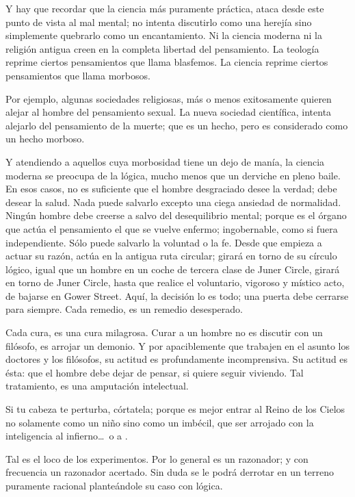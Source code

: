 Y hay que recordar que la ciencia más puramente práctica, ataca desde este punto de vista al mal
mental; no intenta discutirlo como una herejía sino simplemente quebrarlo como un encantamiento. Ni la
ciencia moderna ni la religión antigua creen en la completa libertad del pensamiento. La teología reprime
ciertos pensamientos que llama blasfemos. La ciencia reprime ciertos pensamientos que llama morbosos.

Por ejemplo, algunas sociedades religiosas, más o menos exitosamente quieren alejar al hombre del
pensamiento sexual. La nueva sociedad científica, intenta alejarlo del pensamiento de la muerte; que es un
hecho, pero es considerado como un hecho morboso.

Y atendiendo a aquellos cuya morbosidad tiene un dejo de manía, la ciencia moderna se preocupa
de la lógica, mucho menos que un derviche en pleno baile. En esos casos, no es suficiente que el hombre
desgraciado desee la verdad; debe desear la salud. Nada puede salvarlo excepto una ciega ansiedad de
normalidad. Ningún hombre debe creerse a salvo del desequilibrio mental; porque es el órgano que actúa
el pensamiento el que se vuelve enfermo; ingobernable, como si fuera independiente. Sólo puede salvarlo
la voluntad o la fe. Desde que empieza a actuar su razón, actúa en la antigua ruta circular; girará en torno
de su círculo lógico, igual que un hombre en un coche de tercera clase de Juner Circle, girará en torno de
Juner Circle, hasta que realice el voluntario, vigoroso y místico acto, de bajarse en Gower Street. Aquí, la
decisión lo es todo; una puerta debe cerrarse para siempre. Cada remedio, es un remedio desesperado.

Cada cura, es una cura milagrosa. Curar a un hombre no es discutir con un filósofo, es arrojar un
demonio. Y por apaciblemente que trabajen en el asunto los doctores y los filósofos, su actitud es
profundamente incomprensiva. Su actitud es ésta: que el hombre debe dejar de pensar, si quiere seguir
viviendo. Tal tratamiento, es una amputación intelectual.

Si tu cabeza te perturba, córtatela; porque es mejor entrar al Reino de los Cielos no solamente como
un niño sino como un imbécil, que ser arrojado con la inteligencia al infierno\ldots\ o a .

Tal es el loco de los experimentos. Por lo general es un razonador; y con frecuencia un razonador
acertado. Sin duda se le podrá derrotar en un terreno puramente racional planteándole su caso con lógica.

